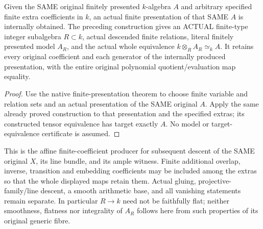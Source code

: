 \begin{theorem}
\label{thm:arithmetic-original-finite-presentation-model}
\leanok
{}
Given the SAME original finitely presented $k$-algebra $A$ and arbitrary
specified finite extra coefficients in $k$, an actual finite presentation
of that SAME $A$ is internally obtained. The preceding construction gives
an ACTUAL finite-type integer subalgebra $R\subset k$, actual descended
finite relations, literal finitely presented model $A_R$, and the actual
whole equivalence $k\otimes_R A_R\simeq_k A$. It retains every original
coefficient and each generator of the internally produced presentation,
with the entire original polynomial quotient/evaluation map equality.
\end{theorem}
\begin{proof}
Use the native finite-presentation theorem to choose finite variable and
relation sets and an actual presentation of the SAME original $A$.
Apply the same already proved construction to that presentation and the
specified extras; its constructed tensor equivalence has target exactly
$A$. No model or target-equivalence certificate is assumed.
\end{proof}

This is the affine finite-coefficient producer for subsequent descent of
the SAME original $X$, its line bundle, and its ample witness. Finite
additional overlap, inverse, transition and embedding coefficients may be
included among the extras so that the whole displayed maps retain them.
Actual gluing, projective-family/line descent, a smooth arithmetic base,
and all vanishing statements remain separate. In particular $R\to k$
need not be faithfully flat; neither smoothness, flatness nor integrality
of $A_R$ follows here from such properties of its original generic fibre.

